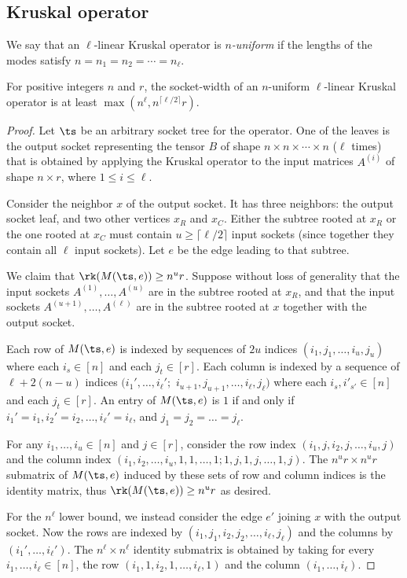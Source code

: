 \subsection{Kruskal operator}

We say that an $\ell$-linear Kruskal operator is \emph{$n$-uniform} if
the lengths of the modes satisfy $n=n_1=n_2=\cdots=n_\ell$.

\begin{lemma}
For positive integers $n$ and $r$, the socket-width of an $n$-uniform $\ell$-linear Kruskal operator is at least $\max\left(n^{\ell}, n^{\lceil\ell/2\rceil}r\right)$.
\end{lemma}
\begin{proof}
  Let $\ts$ be an arbitrary socket tree for the
  operator.  One of the leaves is the output socket representing the
  tensor $B$ of shape $n \times n \times \cdots \times n$ ($\ell$
  times) that is obtained by applying the Kruskal operator to the input matrices
  $A^{(i)}$ of shape $n \times r$, where $1 \le i \le \ell$.

  Consider the neighbor $x$ of the output socket.  It has three
  neighbors: the output socket leaf, and two other vertices $x_R$ and
  $x_C$.  Either the subtree rooted at $x_R$ or the one rooted at $x_C$
  must contain $u \geq \lceil \ell/2 \rceil$ input sockets (since
  together they contain all $\ell$ input sockets).  Let $e$ be the
  edge leading to that subtree.

  We claim that $\rk(M(\ts, e)) \ge n^u r$.  Suppose without loss of
  generality that the input sockets $A^{(1)}, \ldots, A^{(u)}$ are in
  the subtree rooted at $x_R$, and that the input sockets $A^{(u+1)},
  \ldots, A^{(\ell)}$ are in the subtree rooted at $x$ together with
  the output socket.

  Each row of $M(\ts, e)$ is indexed by sequences of $2u$ indices $(i_1, j_1, \ldots, i_u, j_u)$ where each
  $i_s \in [n]$ and each $j_t \in [r]$. Each column is indexed by
  a sequence of $\ell + 2(n-u)$ indices $(i_1', \ldots, i_\ell';$ $
  i_{u+1}, j_{u+1}, \ldots, i_{\ell}, j_{\ell})$ where each $i_s, i'_{s'} \in [n]$
  and each $j_t \in [r]$.  An entry of $M(\ts, e)$ is $1$ if
  and only if $i_1' = i_1, i_2' = i_2, \ldots, i_\ell' = i_\ell$, and
  $j_1 = j_2 = \ldots = j_\ell$.

  For any $i_1, \ldots, i_u \in [n]$ and $j \in [r]$, consider the row index $(i_1, j, i_2, j, \ldots, i_u, j)$ and the column
  index $(i_1, i_2, \ldots, i_u, 1, 1, \ldots, 1; 1, j, 1, j, \ldots,
  1, j)$.  The
  $n^u r \times n^ur$ submatrix of $M(\ts, e)$ induced by these sets of
  row and column indices is the identity matrix, thus $\rk(M(\ts, e))
  \ge n^u r$ as desired.

  For the $n^{\ell}$ lower bound, we
  instead consider the edge $e'$ joining $x$ with the output socket.
  Now the rows are indexed by $(i_1, j_1, i_2, j_2, \ldots, i_\ell, j_\ell)$  and the
  columns by $(i_1', \ldots, i_\ell')$.  The
  $n^\ell \times n^\ell$ identity submatrix is obtained by taking for
  every $i_1, \ldots, i_\ell \in [n]$, the row $(i_1, 1, i_2, 1, \ldots, i_\ell, 1)$ and the column $(i_1, \ldots, i_\ell)$.
\end{proof}




